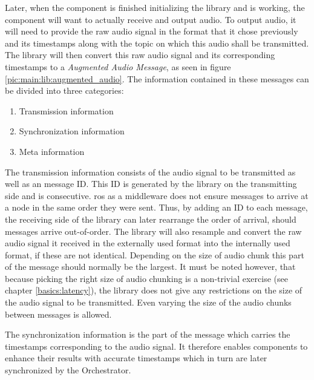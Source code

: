 \label{main:lib:augmented_audio_msg}
Later, when the component is finished initializing the library and is working, %
the component will want to actually receive and output audio.
To output audio, it will need to provide the raw audio signal in the format that it chose previously and its timestamps along with the topic on which this audio shall be transmitted.
The library will then convert this raw audio signal and its corresponding timestamps to a \textit{Augmented Audio Message}, as seen in figure \ref{pic:main:lib:augmented_audio}.
The information contained in these messages can be divided into three categories:
\begin{enumerate}
	\item Transmission information
	\item Synchronization information
	\item Meta information
\end{enumerate}
The transmission information consists of the audio signal to be transmitted as well as an message ID.
This ID is generated by the library on the transmitting side and is consecutive.
\gls{ros} as a middleware does not ensure messages to arrive at a node in the same order they were sent.
Thus, by adding an ID to each message, the receiving side of the library can later rearrange the order of arrival, should messages arrive out-of-order.
The library will also resample and convert the raw audio signal it received in the externally used format into the internally used format, if these are not identical.
Depending on the size of audio chunk this part of the message should normally be the largest.
It must be noted however, that because picking the right size of audio chunking is a non-trivial exercise (see chapter \ref{basics:latency}), the library does not give any restrictions on the size of the audio signal to be transmitted.
Even varying the size of the audio chunks between messages is allowed.  

The synchronization information is the part of the message which carries the timestamps corresponding to the audio signal.
It therefore enables components to enhance their results with accurate timestamps which in turn are later synchronized by the Orchestrator.

